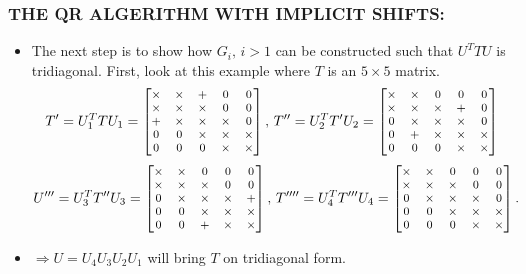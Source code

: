 \documentclass[a4paper,8pt]{beamer} %
\newcommand{\smatrix}[1]{\left[\begin{matrix} #1 \end{matrix}\right]}
\begin{document}
\begin{frame}  %
\frametitle{THE QR ALGERITHM WITH IMPLICIT SHIFTS:}
\begin{itemize}
	\item
	The next step is to show how $G_i,\,i>1$ can be constructed such that $U^TTU$ is tridiagonal.
	First, look at this example where $T$ is an $5\times 5$ matrix.
	\begin{equation}
		\begin{footnotesize}
		T'=U_1 ^T T U_1= 
		\smatrix
		{
			\times 	& \times & + & 0 & 0   \\
			\times 	& \times & \times & 0 & 0   \\
			+   	& \times & \times & \times & 0   \\
			0 & 0 & \times & \times & \times     \\
			0 & 0 & 0 & \times & \times    \\
		}
		,\,
		T''=U_2^T T' U_2 = 
		\smatrix
		{
			\times 	& \times & 0 & 0 & 0   \\
			\times 	& \times & \times & + & 0   \\
			0 	& \times & \times & \times & 0    \\
			0 & + & \times & \times & \times   \\
			0 & 0 & 0 & \times & \times  \\
		}
		\end{footnotesize}
	\end{equation}
	\begin{equation}
		\begin{footnotesize}
		U'''=U_3^T T'' U_3 = 
		\smatrix
		{
			\times 	& \times & 0 & 0 & 0   \\
			\times 	& \times & \times & 0 & 0   \\
			0 	& \times & \times & \times & +\\
			0 & 0 & \times & \times & \times   \\
			0 & 0 & + & \times & \times  \\
		}
		,\,
		T''''=U_4^{T}T'''U_4= 
		\smatrix
		{
			\times 	& \times & 0 & 0 & 0   \\
			\times 	& \times & \times & 0 & 0   \\
			0 	& \times & \times & \times & 0    \\
			0 & 0 & \times & \times & \times   \\
			0 & 0 & 0 & \times & \times  \\
		}
		.
		\end{footnotesize}
	\end{equation}
\item $\Rightarrow U = U_{4}U_{3}U_{2}U_{1}$ will bring $T$ on tridiagonal form.
\end{itemize}
\end{frame}%
\end{document}
